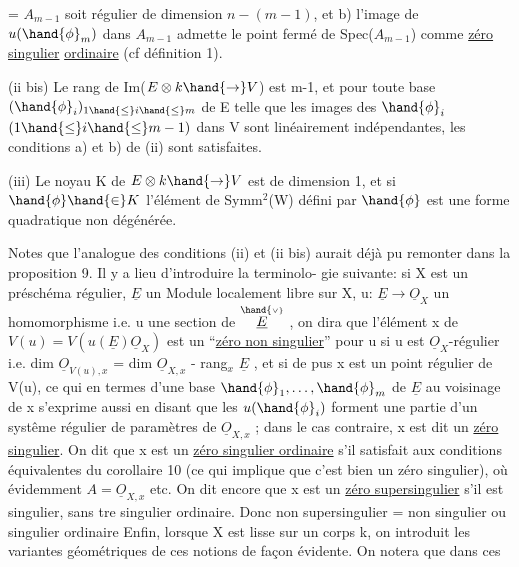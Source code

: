 \placedmargin{\unsure{$\diagup$}}

= $A_{m-1}$
soit  régulier de dimension $n-(m-1)$, et b) l'image de $u(\hand{\phi}_m)$
dans $A_{m-1}$ admette le point fermé de Spec($A_{m-1}$) comme \uline{zéro singulier}
\uline{ordinaire} (cf définition 1).

(ii bis)  Le rang de Im($E\otimes k \hand{\to} V$) est m-1, et pour
toute base $(\hand{\phi}_i)_{1\hand{\leq} i\hand{\leq} m}$ de E telle que les images des $\hand{\phi}_i$ $(1\hand{\leq} i\hand{\leq} m-1)$ dans V
sont linéairement indépendantes, les conditions a) et b) de (ii) sont
satisfaites.

(iii) Le noyau  K de $E\otimes k \hand{\to} V$ est de dimension 1, et si $\hand{\phi}\hand{\in} K$
 l'élément de Symm$^2$(W) défini par $\hand{\phi}$ est une forme quadratique
non dégénérée.

\placedmargin{$\Vert$} Notes que l'analogue des conditions (ii) et (ii bis) aurait déjà
pu remonter dans la proposition 9. Il y a lieu d'introduire la terminolo-%
gie suivante: si X est un préschéma régulier, $\underline{E}$ un Module localement libre
 sur X, u: $\underline{E}\to\underline{O}_X$ un homomorphisme i.e. u une section de
$\overset{\hand{\scriptscriptstyle\vee}}{\underline{E}}$ , on dira que l'élément x de $V(u)=V(u(\underline{E})\underline{O}_X)$ est un 
``\uline{zéro non singulier}'' pour u\hand{,} si u est $\underline{O}_X$-régulier i.e. dim $\underline{O}_{V(u),x}$
= dim $\underline{O}_{X,x}$ - rang$_x$ $\underline{E}$ , et si de pus x est un point régulier de V(u),
ce qui en termes d'une base $\hand{\phi}_1,\ldots,\hand{\phi}_m$ de $\underline{E}$ au voisinage de x s'exprime
aussi en disant que les $u(\hand{\phi}_i)$ forment une partie d'un systême régulier
de paramètres de $\underline{O}_{X,x}$ ; dans le cas contraire, x est dit un \uline{zéro}
\uline{singulier}. On dit que x est un \uline{zéro singulier ordinaire} s'il satisfait
aux conditions équivalentes du corollaire 10 (ce qui implique que c'est
bien un zéro singulier), où évidemment $A=\underline{O}_{X,x}$ etc. On dit encore que
x est un \uline{zéro supersingulier} s'il est singulier, sans \hand{\^{\textcolor{black}{e}}}tre singulier
ordinaire. Donc non supersingulier\placedmargin{\unsure{$\smallsmile$}} = non singulier ou singulier ordinaire
Enfin, lorsque X est lisse sur un corps k, on introduit les variantes
géométriques de ces notions de façon évidente. On notera que dans ces

